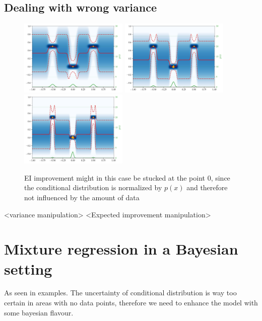 \subsection*{Dealing with wrong variance}
\begin{figure}[H]%
    \centering
    {\includegraphics[width=0.46\textwidth]{Pictures/mixture_regression_variance_problem1.pdf} }%
    \qquad
   {\includegraphics[width=0.46\textwidth]{Pictures/mixture_regression_variance_problem2.pdf} }%
   \qquad
   {\includegraphics[width=0.46\textwidth]{Pictures/mixture_regression_variance_problem3.pdf} }%
   \caption{EI improvement might in this case be stucked at the point 0,
    since the conditional distribution is normalized by $p(x)$ and therefore not
    influenced by the amount of data}%
    \label{MixtureReg_challenge}%
\end{figure}


<variance manipulation>
<Expected improvement manipulation>


\section{Mixture regression in a Bayesian setting}
As seen in examples. The uncertainty of conditional distribution is way too certain
in areas with no data points, therefore we need to enhance the model with some bayesian 
flavour. 

